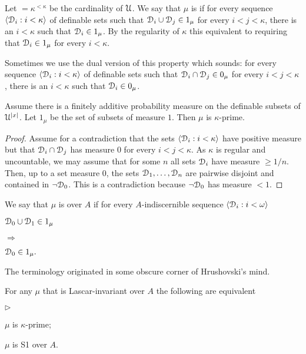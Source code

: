 \documentclass{amsproc}
\newcommand{\mylabel}[1]{{#1}\hfill}
\renewenvironment{itemize}
  {\begin{list}{$\triangleright$}{%
  \setlength{\parskip}{0mm}
  \setlength{\topsep}{.4\baselineskip}
  \setlength{\rightmargin}{0mm}
  \setlength{\listparindent}{0mm}
  \setlength{\itemindent}{0mm}
  \setlength{\labelwidth}{3ex}
  \setlength{\itemsep}{.2\baselineskip}
  \setlength{\parsep}{.2\baselineskip}
  \setlength{\partopsep}{0mm}
  \setlength{\labelsep}{1ex}
  \setlength{\leftmargin}{\labelwidth+\labelsep}
  \let\makelabel\mylabel}}{%
\end{list}}
\renewcommand*{\emph}[1]{%
   \smash{\tikz[baseline]\node[rectangle, fill=teal!25, rounded corners, inner xsep=0.5ex, inner ysep=0.2ex, anchor=base, minimum height = 2.7ex]{\strut #1};}}
\begin{document}
Let \emph{$\kappa$}$=\kappa^{<\kappa}$ be the cardinality of $\EuScript U$.
We say that $\mu$ is \emph{$\kappa$-prime} if for every sequence $\langle\EuScript D_i:i<\kappa\rangle$ of definable sets such that $\EuScript D_i\cup \EuScript D_j\in1_\mu$ for every $i<j<\kappa$, there is an $i<\kappa$ such that $\EuScript D_i\in1_\mu$.
By the regularity of $\kappa$ this equivalent to requiring that  $\EuScript D_i\in1_\mu$ for every $i<\kappa$.

Sometimes we use the dual version of this property which sounds: for every sequence $\langle\EuScript D_i:i<\kappa\rangle$ of definable sets such that $\EuScript D_i\cap \EuScript D_j\in0_\mu$ for every $i<j<\kappa$, there is an $i<\kappa$ such that $\EuScript D_i\in0_\mu$.

\begin{example}
  Assume there is a finitely additive probability measure on the definable subsets of $\EuScript U^{|x|}$.
  Let $1_\mu$ be the set of subsets of measure $1$.
  Then $\mu$ is $\kappa$-prime.
\end{example}

\begin{proof}
  Assume for a contradiction that the sets $\langle\EuScript D_i:i<\kappa\rangle$ have positive measure but that $\EuScript D_i\cap \EuScript D_j$ has measure $0$ for every $i<j<\kappa$.
  As $\kappa$ is regular and uncountable, we may assume that for some $n$ all sets $\EuScript D_i$ have measure $\ge 1/n$.
  Then, up to a set measure $0$, the sets $\EuScript D_1,\dots,\EuScript D_n$ are pairwise disjoint and contained in $\neg\EuScript D_0$.
  This is a contradiction because $\neg\EuScript D_0$ has measure $<1$.
\end{proof}

We say that $\mu$ is \emph{S1\/} over $A$ if for every $A$-indiscernible sequence $\langle\EuScript D_i:i<\omega\rangle$
    
\def\ceq#1#2#3{\parbox[t]{25ex}{$\displaystyle #1$}\parbox{6ex}{\hfil $#2$}{$\displaystyle #3$}}

\ceq{\hfill\EuScript D_0\cup\EuScript D_1\in1_\mu}{\Rightarrow}{\EuScript D_0\in1_\mu.}

The terminology originated in some obscure corner of Hrushovski's mind.

\begin{fact}
  For any $\mu$ that is Lascar-invariant over $A$ the following are equivalent
  \begin{itemize}
    \item[1.] $\mu$ is $\kappa$-prime;
    \item[2.] $\mu$ is S1 over $A$.
  \end{itemize}
\end{fact}
\end{document}
